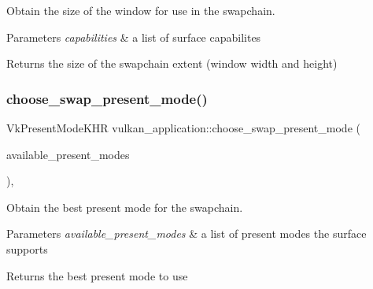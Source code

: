 Obtain the size of the window for use in the swapchain. 


\begin{DoxyParams}{Parameters}
{\em capabilities} & a list of surface capabilites \\
\hline
\end{DoxyParams}
\begin{DoxyReturn}{Returns}
the size of the swapchain extent (window width and height) 
\end{DoxyReturn}
\mbox{\label{classvulkan__application_ae5d3e32c1119dcf663b76b00f49292a9}} 
\subsubsection{\texorpdfstring{choose\+\_\+swap\+\_\+present\+\_\+mode()}{choose\_swap\_present\_mode()}}
{\footnotesize\ttfamily Vk\+Present\+Mode\+K\+HR vulkan\+\_\+application\+::choose\+\_\+swap\+\_\+present\+\_\+mode (\begin{DoxyParamCaption}\item[{const std\+::vector$<$ Vk\+Present\+Mode\+K\+HR $>$}]{available\+\_\+present\+\_\+modes }\end{DoxyParamCaption})\hspace{0.3cm}{\ttfamily [static]}, {\ttfamily [private]}}



Obtain the best present mode for the swapchain. 


\begin{DoxyParams}{Parameters}
{\em available\+\_\+present\+\_\+modes} & a list of present modes the surface supports \\
\hline
\end{DoxyParams}
\begin{DoxyReturn}{Returns}
the best present mode to use 
\end{DoxyReturn}
\mbox{\label{classvulkan__application_ae3a147ea9e78ef40044f715debd47f9d}} 

